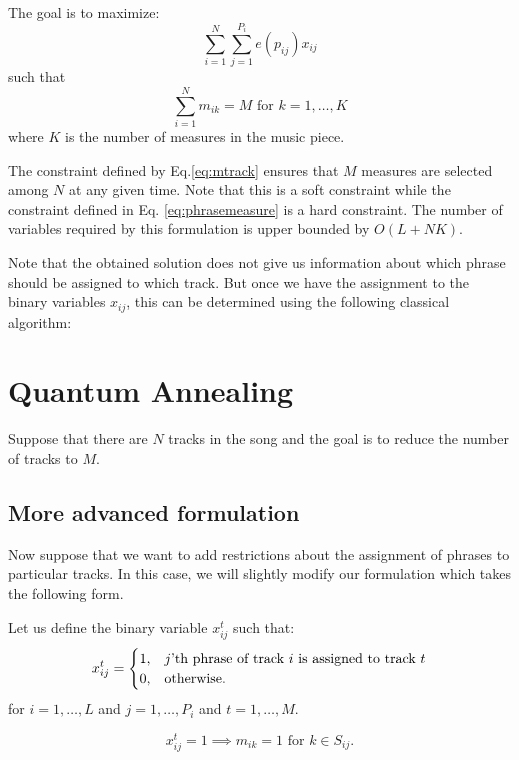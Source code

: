 \documentclass[11pt,a4paper]{article}
\begin{document}
The goal is to maximize:
\begin{equation}
\sum_{i=1}^N\sum_{j=1}^{P_i} e(p_{ij})x_{ij}
\end{equation}
such that
\begin{equation}\label{eq:mtrack}
\sum_{i=1}^N m_{ik} = M \mbox{ for }k=1,\dots, K 
\end{equation}
where $K$ is the number of measures in the music piece. 

The constraint defined by Eq.\eqref{eq:mtrack} ensures that $M$ measures are selected among $ N $ at any given time. Note that this is a soft constraint while the constraint defined in Eq. \ref{eq:phrasemeasure} is a hard constraint. The number of variables required by this formulation is upper bounded by $ O(L+NK) $.

Note that the obtained solution does not give us information about which phrase should be assigned to which track. But once we have the assignment to the binary variables $ x_{ij} $, this can be determined using the following classical algorithm:

\section{Quantum Annealing}


Suppose that there are $ N $ tracks in the song and the goal is to reduce the number of tracks to $ M $.

 
 \subsection{More advanced formulation}
 
 Now suppose that we want to add restrictions about the assignment of phrases to particular tracks. In this case, we will slightly modify our formulation which takes the following form.
 
  Let us define the binary variable $x_{ij}^t$ such that:
 \begin{equation}
 x_{ij}^t =   \begin{cases}%
 1,      & \text{$j$'th phrase of track $i$ is assigned to track $ t $}\\
 0, & \text{otherwise.}
 \end{cases}
 \end{equation}
 for $ i = 1, \dots ,L $ and $ j=1, \dots ,P_i  $ and $ t = 1, \dots, M $.
 
\begin{equation}
 x_{ij}^t = 1 \implies m_{ik}=1 \mbox{ for } k \in S_{ij}.
 \end{equation}
\end{document}
